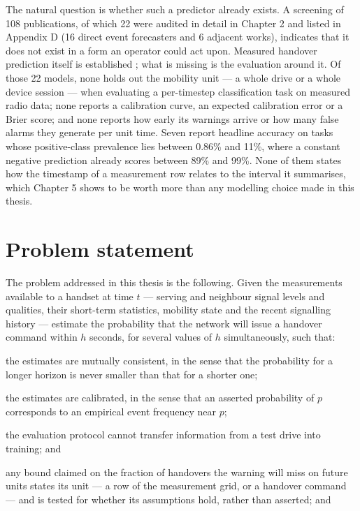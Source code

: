 The natural question is whether such a predictor already exists. A screening of 108 publications, of which 22 were audited in detail in Chapter 2 and listed in Appendix D (16 direct event forecasters and 6 adjacent works), indicates that it does not exist in a form an operator could act upon. Measured handover prediction itself is established \cite{ref5,ref54}; what is missing is the evaluation around it. Of those 22 models, none holds out the mobility unit --- a whole drive or a whole device session --- when evaluating a per-timestep classification task on measured radio data; none reports a calibration curve, an expected calibration error or a Brier score; and none reports how early its warnings arrive or how many false alarms they generate per unit time. Seven report headline accuracy on tasks whose positive-class prevalence lies between 0.86\% and 11\%, where a constant negative prediction already scores between 89\% and 99\%. None of them states how the timestamp of a measurement row relates to the interval it summarises, which Chapter 5 shows to be worth more than any modelling choice made in this thesis.


\section{Problem statement}
\label{sec:1_3}

The problem addressed in this thesis is the following. Given the measurements available to a handset at time $t$ --- serving and neighbour signal levels and qualities, their short-term statistics, mobility state and the recent signalling history --- estimate the probability that the network will issue a handover command within $h$ seconds, for several values of $h$ simultaneously, such that:

the estimates are mutually consistent, in the sense that the probability for a longer horizon is never smaller than that for a shorter one;

the estimates are calibrated, in the sense that an asserted probability of $p$ corresponds to an empirical event frequency near $p$;

the evaluation protocol cannot transfer information from a test drive into training; and

any bound claimed on the fraction of handovers the warning will miss on future units states its unit --- a row of the measurement grid, or a handover command --- and is tested for whether its assumptions hold, rather than asserted; and

